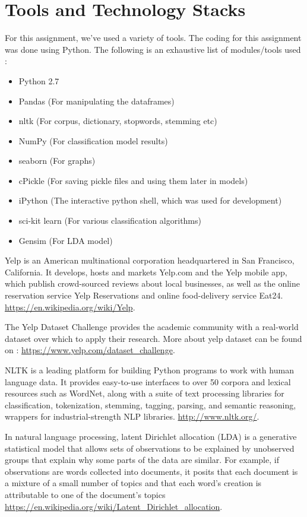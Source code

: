 \documentclass[paper=a4, fontsize=11pt]{scrartcl} %
\numberwithin{equation}{section} %
\numberwithin{figure}{section} %
\numberwithin{table}{section} %
\begin{document}
\section{Tools and Technology Stacks}
For this assignment, we've used a variety of tools. The coding for this assignment was done using Python. The following is an exhaustive list of modules/tools used : 
\begin{itemize}
   \item Python 2.7
   \item Pandas (For manipulating the dataframes)
   \item nltk (For corpus, dictionary, stopwords, stemming etc)
   \item NumPy (For classification model results)
   \item seaborn (For graphs)
   \item cPickle (For saving pickle files and using them later in models)
   \item iPython (The interactive python shell, which was used for development)
   \item sci-kit learn (For various classification algorithms)
   \item Gensim (For LDA model)
   \end{itemize}


\newpage
\begin{thebibliography}{}
 Yelp is an American multinational corporation headquartered in San Francisco, California. It develops, hosts and markets Yelp.com and the Yelp mobile app, which publish crowd-sourced reviews about local businesses, as well as the online reservation service Yelp Reservations and online food-delivery service Eat24. \url{https://en.wikipedia.org/wiki/Yelp}. 
 
The Yelp Dataset Challenge provides the academic community with a real-world dataset over which to apply their research. More about yelp dataset can be found on :  \url{https://www.yelp.com/dataset_challenge}. 
 
NLTK is a leading platform for building Python programs to work with human language data. It provides easy-to-use interfaces to over 50 corpora and lexical resources such as WordNet, along with a suite of text processing libraries for classification, tokenization, stemming, tagging, parsing, and semantic reasoning, wrappers for industrial-strength NLP libraries. \url{http://www.nltk.org/}. 
 
In natural language processing, latent Dirichlet allocation (LDA) is a generative statistical model that allows sets of observations to be explained by unobserved groups that explain why some parts of the data are similar. For example, if observations are words collected into documents, it posits that each document is a mixture of a small number of topics and that each word's creation is attributable to one of the document's topics \url{https://en.wikipedia.org/wiki/Latent_Dirichlet_allocation}. 
  
\end{thebibliography}
\end{document}

